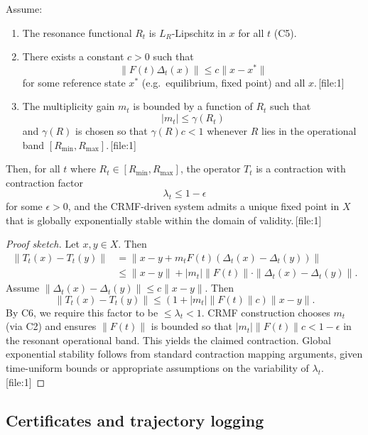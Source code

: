 \documentclass[11pt]{article}
\begin{document}
\begin{theorem}
Assume:
\begin{enumerate}[leftmargin=1.5em]
  \item The resonance functional $R_t$ is $L_R$-Lipschitz in $x$ for all $t$ (C5).
  \item There exists a constant $c > 0$ such that
  \[
    \|F(t)\Delta_t(x)\| \leq c \|x - x^*\|
  \]
  for some reference state $x^*$ (e.g.\ equilibrium, fixed point) and all $x$.\,[file:1]
  \item The multiplicity gain $m_t$ is bounded by a function of $R_t$ such that
  \[
    |m_t| \leq \gamma(R_t)
  \]
  and $\gamma(R)$ is chosen so that $\gamma(R) c < 1$ whenever $R$ lies in the operational band $[R_{\min}, R_{\max}]$.\,[file:1]
\end{enumerate}
Then, for all $t$ where $R_t \in [R_{\min}, R_{\max}]$, the operator $T_t$ is a contraction with contraction factor
\[
  \lambda_t \leq 1 - \epsilon
\]
for some $\epsilon > 0$, and the CRMF-driven system admits a unique fixed point in $X$ that is globally exponentially stable within the domain of validity.\,[file:1]
\end{theorem}

\begin{proof}[Proof sketch]
Let $x,y \in X$.
Then
\begin{align*}
  \|T_t(x) - T_t(y)\|
    &= \|x - y + m_t F(t)(\Delta_t(x) - \Delta_t(y))\| \\
    &\leq \|x - y\| + |m_t| \|F(t)\| \cdot \|\Delta_t(x) - \Delta_t(y)\|.
\end{align*}
Assume $\|\Delta_t(x) - \Delta_t(y)\| \leq c \|x-y\|$.
Then
\[
  \|T_t(x) - T_t(y)\| \leq (1 + |m_t|\|F(t)\|c) \|x-y\|.
\]
By C6, we require this factor to be $\leq \lambda_t < 1$.
CRMF construction chooses $m_t$ (via C2) and ensures $\|F(t)\|$ is bounded so that $|m_t|\|F(t)\|c < 1 - \epsilon$ in the resonant operational band.
This yields the claimed contraction.
Global exponential stability follows from standard contraction mapping arguments, given time-uniform bounds or appropriate assumptions on the variability of $\lambda_t$.\,[file:1]
\end{proof}

\subsection{Certificates and trajectory logging}
\end{document}
